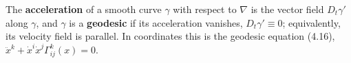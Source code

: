 \begin{definition}[Geodesic]
\label{def:geodesic}
\leanok
The \textbf{acceleration} of a smooth curve $\gamma$ with respect to $\nabla$ is the vector field $D_t \gamma'$ along $\gamma$, and $\gamma$ is a \textbf{geodesic} if its acceleration vanishes, $D_t \gamma' \equiv 0$; equivalently, its velocity field is parallel. In coordinates this is the geodesic equation (4.16), $\ddot{x}^k + \dot{x}^i \dot{x}^j \Gamma^k_{ij}(x) = 0$.
\end{definition}

